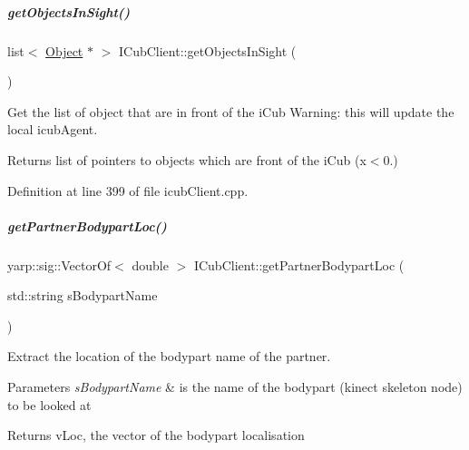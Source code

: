 \mbox{\label{group__icubclient__clients_aadf74f6b99e053bedc3665a41c04f89b}} 
\subparagraph{\texorpdfstring{get\+Objects\+In\+Sight()}{getObjectsInSight()}}
{\footnotesize\ttfamily list$<$ \hyperlink{group__icubclient__representations_classicubclient_1_1Object}{Object} $\ast$ $>$ I\+Cub\+Client\+::get\+Objects\+In\+Sight (\begin{DoxyParamCaption}{ }\end{DoxyParamCaption})}



Get the list of object that are in front of the i\+Cub Warning\+: this will update the local icub\+Agent. 

\begin{DoxyReturn}{Returns}
list of pointers to objects which are front of the i\+Cub (x$<$0.) 
\end{DoxyReturn}


Definition at line 399 of file icub\+Client.\+cpp.

\mbox{\label{group__icubclient__clients_ae40ff3f75d4c2fa6d4e2d0c55ee568ca}} 
\subparagraph{\texorpdfstring{get\+Partner\+Bodypart\+Loc()}{getPartnerBodypartLoc()}}
{\footnotesize\ttfamily yarp\+::sig\+::\+Vector\+Of$<$ double $>$ I\+Cub\+Client\+::get\+Partner\+Bodypart\+Loc (\begin{DoxyParamCaption}\item[{std\+::string}]{s\+Bodypart\+Name }\end{DoxyParamCaption})}



Extract the location of the bodypart name of the partner. 


\begin{DoxyParams}{Parameters}
{\em s\+Bodypart\+Name} & is the name of the bodypart (kinect skeleton node) to be looked at \\
\hline
\end{DoxyParams}
\begin{DoxyReturn}{Returns}
v\+Loc, the vector of the bodypart localisation 
\end{DoxyReturn}


